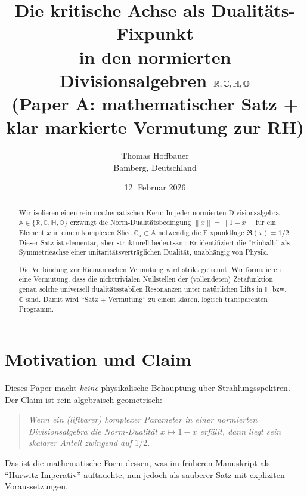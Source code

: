 \documentclass[11pt,a4paper]{article}
\title{%
Die kritische Achse als Dualit\"ats-Fixpunkt\\
in den normierten Divisionsalgebren $\R,\C,\Hh,\Okt$\\
(Paper A: mathematischer Satz + klar markierte Vermutung zur RH)
}
\author{Thomas Hoffbauer\\Bamberg, Deutschland}
\date{12. Februar 2026}
\theoremstyle{plain}
\theoremstyle{definition}
\theoremstyle{remark}
\newcommand{\C}{\mathbb{C}}
\newcommand{\R}{\mathbb{R}}
\newcommand{\Hh}{\mathbb{H}}
\newcommand{\Okt}{\mathbb{O}}
\begin{document}
\maketitle

\begin{abstract}
Wir isolieren einen rein mathematischen Kern: In jeder normierten Divisionsalgebra
$\mathbb{A}\in\{\R,\C,\Hh,\Okt\}$ erzwingt die Norm-Dualit\"atsbedingung
$\|x\|=\|1-x\|$ f\"ur ein Element $x$ in einem komplexen Slice $\C_u\subset\mathbb{A}$
notwendig die Fixpunktlage $\Re(x)=1/2$.
Dieser Satz ist elementar, aber strukturell bedeutsam: Er identifiziert die ``Einhalb'' als
Symmetrieachse einer unitarit\"atsvertr\"aglichen Dualit\"at, unabh\"angig von Physik.

Die Verbindung zur Riemannschen Vermutung wird strikt getrennt: Wir formulieren eine
Vermutung, dass die nichttrivialen Nullstellen der (vollendeten) Zetafunktion genau solche
universell dualit\"atsstabilen Resonanzen unter nat\"urlichen Lifts in $\Hh$ bzw.\ $\Okt$ sind.
Damit wird ``Satz + Vermutung'' zu einem klaren, logisch transparenten Programm.
\end{abstract}

\section{Motivation und Claim}
Dieses Paper macht \emph{keine} physikalische Behauptung \"uber Strahlungsspektren.
Der Claim ist rein algebraisch-geometrisch:

\begin{quote}
\emph{Wenn ein (liftbarer) komplexer Parameter in einer normierten Divisionsalgebra die Norm-Dualit\"at
$x\mapsto 1-x$ erf\"ullt, dann liegt sein skalarer Anteil zwingend auf $1/2$.}
\end{quote}

Das ist die mathematische Form dessen, was im fr\"uheren Manuskript als ``Hurwitz-Imperativ''
auftauchte, nun jedoch als sauberer Satz mit expliziten Voraussetzungen.
\end{document}
